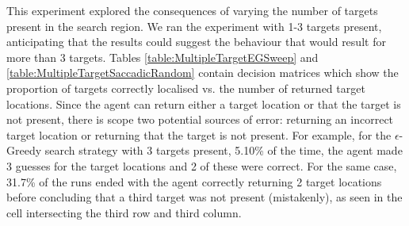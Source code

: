 This experiment explored the consequences of varying the number of targets present in the search region. We ran the experiment with 1-3 targets present, anticipating that the results could suggest the behaviour that would result for more than 3 targets. Tables \ref{table:MultipleTargetEGSweep} and \ref{table:MultipleTargetSaccadicRandom} contain decision matrices which show the proportion of targets correctly localised vs. the number of returned target locations. Since the agent can return either a target location or that the target is not present, there is scope two potential sources of error: returning an incorrect target location or returning that the target is not present. For example, for the $\epsilon$-Greedy search strategy with 3 targets present, 5.10\% of the time, the agent made 3 guesses for the target locations and 2 of these were correct. For the same case, 31.7\% of the runs ended with the agent correctly returning 2 target locations before concluding that a third target was not present (mistakenly), as seen in the cell intersecting the third row and third column.


